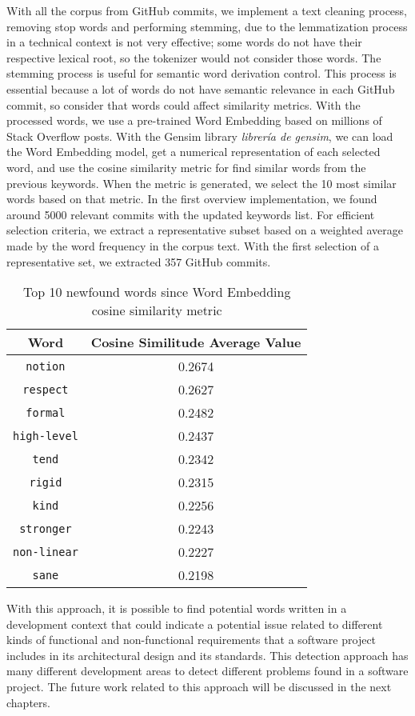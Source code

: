 With all the corpus from GitHub commits, we implement a text cleaning process, removing stop words and performing stemming, due to the lemmatization process in a technical context is not very effective; some words do not have their respective lexical root, so the tokenizer would not consider those words. The stemming process is useful for semantic word derivation control. This process is essential because a lot of words do not have semantic relevance in each GitHub commit, so consider that words could affect similarity metrics. With the processed words, we use a pre-trained Word Embedding based on millions of Stack Overflow posts. With the Gensim library \emph{librería de gensim}, we can load the Word Embedding model, get a numerical representation of each selected word, and use the cosine similarity metric for find similar words from the previous keywords. When the metric is generated, we select the 10 most similar words based on that metric.
In the first overview implementation, we found around 5000 relevant commits with the updated keywords list. For efficient selection criteria, we extract a representative subset based on a weighted average made by the word frequency in the corpus text. With the first selection of a representative set, we extracted 357 GitHub commits. 


\begin{table}[H]
    \centering
    \begin{tabular}{|c|c|}
    \hline
       Word  & Cosine Similitude Average Value \\
       \hline
        \texttt{notion} & 0.2674 \\
        \hline
        \texttt{respect} & 0.2627 \\
        \hline
        \texttt{formal} & 0.2482 \\
        \hline
        \texttt{high-level} & 0.2437 \\
        \hline
        \texttt{tend} & 0.2342 \\
        \hline
        \texttt{rigid} & 0.2315 \\
        \hline
        \texttt{kind} & 0.2256 \\
        \hline
        \texttt{stronger} & 0.2243 \\
        \hline
        \texttt{non-linear} & 0.2227 \\
        \hline
        \texttt{sane} & 0.2198 \\
        \hline
    \end{tabular}
    \caption{Top 10 newfound words since Word Embedding cosine similarity metric}
    \label{tab:my_label}
\end{table}

With this approach, it is possible to find potential words written in a development context that could indicate a potential issue related to different kinds of functional and non-functional requirements that a software project includes in its architectural design and its standards. This detection approach has many different development areas to detect different problems found in a software project. The future work related to this approach will be discussed in the next chapters.
\endinput